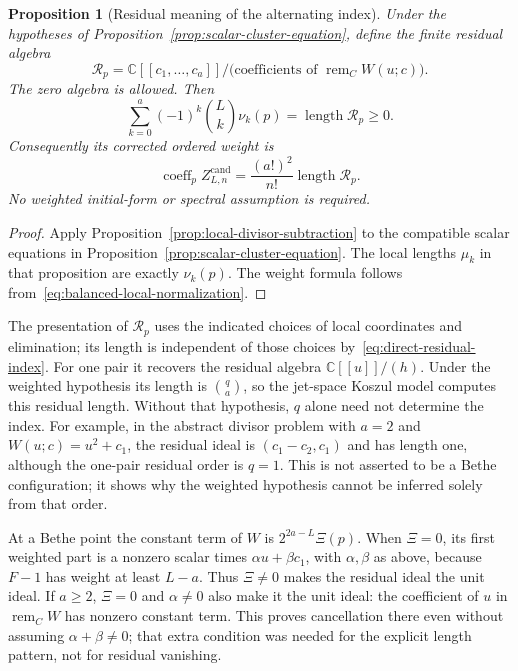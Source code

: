 \documentclass[11pt]{article}
\newtheorem{proposition}{Proposition}[section]
\theoremstyle{definition}
\newcommand{\C}{\mathbb C}
\newcommand{\length}{\operatorname{length}}
\begin{document}
\begin{proposition}[Residual meaning of the alternating index]
\label{prop:direct-residual-index}
Under the hypotheses of Proposition~\ref{prop:scalar-cluster-equation},
define the finite residual algebra
\begin{equation}\label{eq:direct-residual-algebra}
 \mathcal R_p=\C[[c_1,\ldots,c_a]]/
       \bigl(\text{coefficients of }\operatorname{rem}_C W(u;c)\bigr).
\end{equation}
The zero algebra is allowed. Then
\begin{equation}\label{eq:direct-residual-index}
 \boxed{\sum_{k=0}^a(-1)^k\binom Lk\nu_k(p)
                  =\length\mathcal R_p\ge0.}
\end{equation}
Consequently its corrected ordered weight is
\[
 \operatorname{coeff}_p Z^{\mathrm{cand}}_{L,n}
       =\frac{(a!)^2}{n!}\length\mathcal R_p.
\]
No weighted initial-form or spectral assumption is required.
\end{proposition}

\begin{proof}
Apply Proposition~\ref{prop:local-divisor-subtraction} to the compatible
scalar equations in Proposition~\ref{prop:scalar-cluster-equation}.
The local lengths $\mu_k$ in that proposition are exactly $\nu_k(p)$.
The weight formula follows from~\eqref{eq:balanced-local-normalization}.
\end{proof}

The presentation of $\mathcal R_p$ uses the indicated choices of local
coordinates and elimination; its length is independent of those choices
by~\eqref{eq:direct-residual-index}. For one pair it recovers the
residual algebra $\C[[u]]/(h)$. Under the weighted hypothesis its length
is $\binom qa$, so the jet-space Koszul model computes this residual
length. Without that hypothesis, $q$ alone need not determine the index.
For example, in the abstract divisor problem with $a=2$ and
$W(u;c)=u^2+c_1$, the residual ideal is $(c_1-c_2,c_1)$ and has length
one, although the one-pair residual order is $q=1$. This is not asserted
to be a Bethe configuration; it shows why the weighted hypothesis cannot
be inferred solely from that order.

At a Bethe point the constant term of $W$ is $2^{2a-L}\Xi(p)$.
When $\Xi=0$, its first weighted part is a nonzero scalar times
$\alpha u+\beta c_1$, with $\alpha,\beta$ as above, because $F-1$ has
weight at least $L-a$. Thus $\Xi\ne0$ makes the residual ideal the unit
ideal. If $a\ge2$, $\Xi=0$ and $\alpha\ne0$ also make it the unit
ideal: the coefficient of $u$ in $\operatorname{rem}_C W$ has nonzero
constant term. This proves cancellation there even without assuming
$\alpha+\beta\ne0$; that extra condition was needed for the explicit
length pattern, not for residual vanishing.
\end{document}
